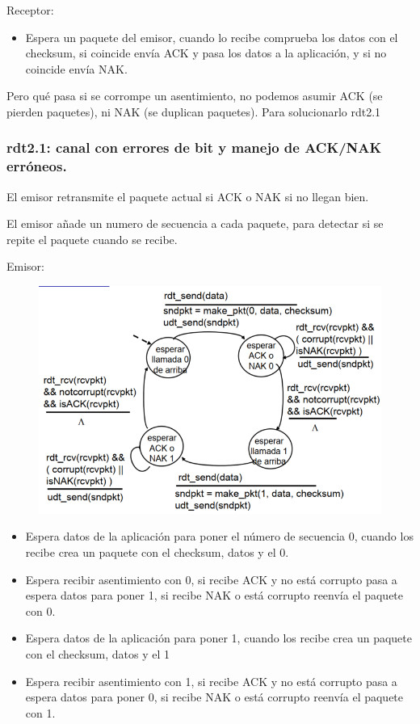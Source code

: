 \documentclass[12pt, twoside, openright]{report} %
\begin{document}
Receptor:

\begin{itemize}
	\item Espera un paquete del emisor, cuando lo recibe comprueba los
	      datos con el checksum, si coincide envía ACK y pasa los datos a
	      la aplicación, y si no coincide envía NAK.
\end{itemize}

Pero qué pasa si se corrompe un asentimiento, no podemos asumir
ACK (se pierden paquetes), ni NAK (se duplican paquetes). Para
solucionarlo rdt2.1
\pagebreak
\subsubsection{rdt2.1: canal con errores de bit y manejo de ACK/NAK erróneos.}


El emisor retransmite el paquete actual si ACK o NAK si no llegan
bien.

El emisor añade un numero de secuencia a cada paquete, para
detectar si se repite el paquete cuando se recibe.

Emisor:
\begin{figure}[H]
	{\includegraphics[scale=.45]{Untitled 12.png}}
\end{figure}
\begin{itemize}
	\item Espera datos de la aplicación para poner el número de secuencia
	      0, cuando los recibe crea un paquete con el checksum, datos y el
	      0.
	\item Espera recibir asentimiento con 0, si recibe ACK y no está
	      corrupto pasa a espera datos para poner 1, si recibe NAK o está
	      corrupto reenvía el paquete con 0.
	\item Espera datos de la aplicación para poner 1, cuando los recibe
	      crea un paquete con el checksum, datos y el 1
	\item Espera recibir asentimiento con 1, si recibe ACK y no está
	      corrupto pasa a espera datos para poner 0, si recibe NAK o está
	      corrupto reenvía el paquete con 1.
\end{itemize}
\end{document}
